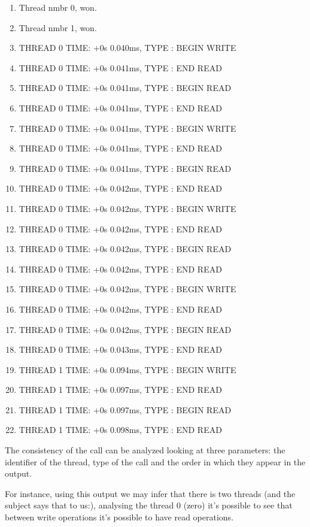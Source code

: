 \documentclass{article}
\begin{document}
		\begin{enumerate}
		      \item Thread nmbr 0, won.
		      \item Thread nmbr 1, won.
		      \item THREAD 0 TIME: +0s 0.040ms, TYPE : BEGIN WRITE
		      \item THREAD 0 TIME: +0s 0.041ms, TYPE : END READ
		      \item THREAD 0 TIME: +0s 0.041ms, TYPE : BEGIN READ
		      \item THREAD 0 TIME: +0s 0.041ms, TYPE : END READ
		      \item THREAD 0 TIME: +0s 0.041ms, TYPE : BEGIN WRITE
		      \item THREAD 0 TIME: +0s 0.041ms, TYPE : END READ
		      \item THREAD 0 TIME: +0s 0.041ms, TYPE : BEGIN READ
		      \item THREAD 0 TIME: +0s 0.042ms, TYPE : END READ
		      \item THREAD 0 TIME: +0s 0.042ms, TYPE : BEGIN WRITE
		      \item THREAD 0 TIME: +0s 0.042ms, TYPE : END READ
		      \item THREAD 0 TIME: +0s 0.042ms, TYPE : BEGIN READ
		      \item THREAD 0 TIME: +0s 0.042ms, TYPE : END READ
		      \item THREAD 0 TIME: +0s 0.042ms, TYPE : BEGIN WRITE
		      \item THREAD 0 TIME: +0s 0.042ms, TYPE : END READ
		      \item THREAD 0 TIME: +0s 0.042ms, TYPE : BEGIN READ
		      \item THREAD 0 TIME: +0s 0.043ms, TYPE : END READ
		      \item THREAD 1 TIME: +0s 0.094ms, TYPE : BEGIN WRITE
		      \item THREAD 1 TIME: +0s 0.097ms, TYPE : END READ
		      \item THREAD 1 TIME: +0s 0.097ms, TYPE : BEGIN READ
		      \item THREAD 1 TIME: +0s 0.098ms, TYPE : END READ   
		\end{enumerate}

		The consistency of the call can be analyzed looking at three parameters: the identifier of 
		the thread, type of the call and the order in which they appear in the output.

		For instance, using this output we may infer that there is two threads (and the subject says 
		that to us:), analysing the thread 0 (zero) it's possible to see that between write operations
		it's possible to have read operations.
\end{document}
